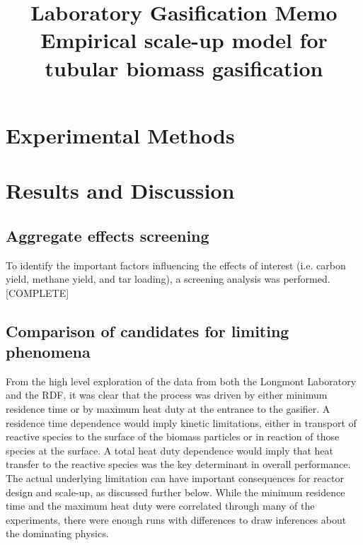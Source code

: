 \documentclass[11pt,twocolumn]{article}
\date{}
\title{Laboratory Gasification Memo\\Empirical scale-up model for tubular biomass gasification \vspace{-6ex}}
\begin{document}
\twocolumn[
  \begin{@twocolumnfalse}
    \maketitle
    \begin{abstract}
    


    \end{abstract}
  \end{@twocolumnfalse}
]

\section*{Experimental Methods}



\section*{Results and Discussion}

\subsection*{Aggregate effects screening}
To identify the important factors influencing the effects of interest (i.e. carbon yield, methane yield, and tar loading), a screening analysis was performed. [COMPLETE]

\subsection*{Comparison of candidates for limiting phenomena}
From the high level exploration of the data from both the Longmont Laboratory and the RDF, it was clear that the process was driven by either minimum residence time or by maximum heat duty at the entrance to the gasifier.  A residence time dependence would imply kinetic limitations, either in transport of reactive species to the surface of the biomass particles or in reaction of those species at the surface.  A total heat duty dependence would imply that heat transfer to the reactive species was the key determinant in overall performance.  The actual underlying limitation can have important consequences for reactor design and scale-up, as discussed further below.  While the minimum residence time and the maximum heat duty were correlated through many of the experiments, there were enough runs with differences to draw inferences about the dominating physics.
\end{document}
